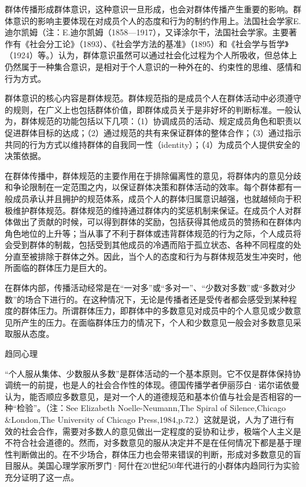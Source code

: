 \documentclass[UTF8,12pt]{ctexart}
\numberwithin{equation}{section} %
\numberwithin{figure}{section}
\numberwithin{table}{section}
\begin{document}
	群体传播形成群体意识，这种意识一旦形成，也会对群体传播产生重要的影响。群体意识的影响主要体现在对成员个人的态度和行为的制约作用上。法国社会学家E.迪尔凯姆（注：E.迪尔凯姆（1858—1917），又译涂尔干，法国社会学家。主要著作有《社会分工论》（1893）、《社会学方法的基准》（1895）和《社会学与哲学》（1924）等。）认为，群体意识虽然可以通过社会化过程为个人所吸收，但总体上仍然属于一种集合意识，是相对于个人意识的一种外在的、约束性的思维、感情和行为方式。
	
	群体意识的核心内容是群体规范。群体规范指的是成员个人在群体活动中必须遵守的规则，在广义上也包括群体价值，即群体成员关于是非好坏的判断标准。一般认为，群体规范的功能包括以下几项：（1）协调成员的活动、规定成员角色和职责以促进群体目标的达成；（2）通过规范的共有来保证群体的整体合作；（3）通过指示共同的行为方式以维持群体的自我同一性（identity）；（4）为成员个人提供安全的决策依据。
	
	在群体传播中，群体规范的主要作用在于排除偏离性的意见，将群体内的意见分歧和争论限制在一定范围之内，以保证群体决策和群体活动的效率。每个群体都有一般成员承认并且拥护的规范体系，成员个人的群体归属意识越强，也就越倾向于积极维护群体规范。群体规范的维持通过群体内的奖惩机制来保证。在成员个人对群体做出了贡献的时候，可以得到群体的奖励，包括获得其他成员的赞扬和在群体内角色地位的上升等；当从事了不利于群体或违背群体规范的行为之际，个人成员将会受到群体的制裁，包括受到其他成员的冷遇而陷于孤立状态、各种不同程度的处分直至被排除于群体之外。因此，当个人的态度和行为与群体规范发生冲突时，他所面临的群体压力是巨大的。
	
	在群体内部，传播活动经常是在“一对多”或“多对一”、“少数对多数”或“多数对少数”的场合下进行的。在这种情况下，无论是传播者还是受传者都会感受到某种程度的群体压力。所谓群体压力，即群体中的多数意见对成员中的个人意见或少数意见所产生的压力。在面临群体压力的情况下，个人和少数意见一般会对多数意见采取服从态度。
	
	趋同心理
	
	“个人服从集体、少数服从多数”是群体活动的一个基本原则。它不仅是群体保持协调统一的前提，也是人的社会合作性的体现。德国传播学者伊丽莎白·诺尔诺依曼认为，能否顺应多数意见，是对一个人的道德规范和基本价值与社会是否相容的一种“检验”。（注：See Elizabeth Noelle-Neumann,The Spiral of Silence,Chicago \&London,The University of Chicago Press,1984,p.72.）这就是说，人为了进行有效的社会合作，需要对多数人的意见做出一定程度的妥协和让步，极端个人主义是不符合社会道德的。然而，对多数意见的服从决定并不是在任何情况下都是基于理性判断做出的。在不少场合，群体压力也会带来错误的判断，形成对多数意见的盲目服从。美国心理学家所罗门·阿什在20世纪50年代进行的小群体内趋同行为实验充分证明了这一点。
	
\end{document}
